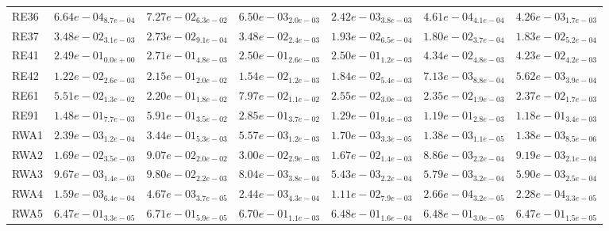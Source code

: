 \documentclass{article}
\begin{document}
\begin{table}
\begin{scriptsize}
\begin{tabular}{lllllll}
RE36 & \cellcolor{gray25}$  6.64e-04_{ 8.7e-04}$ & $  7.27e-02_{ 6.3e-02}$ & $  6.50e-03_{ 2.0e-03}$ & $  2.42e-03_{ 3.8e-03}$ & \cellcolor{gray95}$  4.61e-04_{ 4.1e-04}$ & $  4.26e-03_{ 1.7e-03}$ \\
RE37 & $  3.48e-02_{ 3.1e-03}$ & $  2.73e-02_{ 9.1e-04}$ & $  3.48e-02_{ 2.4e-03}$ & $  1.93e-02_{ 6.5e-04}$ & \cellcolor{gray95}$  1.80e-02_{ 3.7e-04}$ & \cellcolor{gray25}$  1.83e-02_{ 5.2e-04}$ \\
RE41 & $  2.49e-01_{ 0.0e+00}$ & $  2.71e-01_{ 4.8e-03}$ & $  2.50e-01_{ 2.6e-03}$ & $  2.50e-01_{ 1.2e-03}$ & \cellcolor{gray25}$  4.34e-02_{ 4.8e-03}$ & \cellcolor{gray95}$  4.23e-02_{ 4.2e-03}$ \\
RE42 & $  1.22e-02_{ 2.6e-03}$ & $  2.15e-01_{ 2.0e-02}$ & $  1.54e-02_{ 1.2e-03}$ & $  1.84e-02_{ 5.4e-03}$ & \cellcolor{gray25}$  7.13e-03_{ 8.8e-04}$ & \cellcolor{gray95}$  5.62e-03_{ 3.9e-04}$ \\
RE61 & $  5.51e-02_{ 1.3e-02}$ & $  2.20e-01_{ 1.8e-02}$ & $  7.97e-02_{ 1.1e-02}$ & $  2.55e-02_{ 3.0e-03}$ & \cellcolor{gray95}$  2.35e-02_{ 1.9e-03}$ & \cellcolor{gray25}$  2.37e-02_{ 1.7e-03}$ \\
RE91 & $  1.48e-01_{ 7.7e-03}$ & $  5.91e-01_{ 3.5e-02}$ & $  2.85e-01_{ 3.7e-02}$ & $  1.29e-01_{ 9.4e-03}$ & \cellcolor{gray25}$  1.19e-01_{ 2.8e-03}$ & \cellcolor{gray95}$  1.18e-01_{ 3.4e-03}$ \\
RWA1 & $  2.39e-03_{ 1.2e-04}$ & $  3.44e-01_{ 5.3e-03}$ & $  5.57e-03_{ 1.2e-03}$ & $  1.70e-03_{ 3.3e-05}$ & \cellcolor{gray25}$  1.38e-03_{ 1.1e-05}$ & \cellcolor{gray95}$  1.38e-03_{ 8.5e-06}$ \\
RWA2 & $  1.69e-02_{ 3.5e-03}$ & $  9.07e-02_{ 2.0e-02}$ & $  3.00e-02_{ 2.9e-03}$ & $  1.67e-02_{ 1.4e-03}$ & \cellcolor{gray95}$  8.86e-03_{ 2.2e-04}$ & \cellcolor{gray25}$  9.19e-03_{ 2.1e-04}$ \\
RWA3 & $  9.67e-03_{ 1.4e-03}$ & $  9.80e-02_{ 2.2e-03}$ & $  8.04e-03_{ 3.8e-04}$ & \cellcolor{gray95}$  5.43e-03_{ 2.2e-04}$ & \cellcolor{gray25}$  5.79e-03_{ 3.2e-04}$ & $  5.90e-03_{ 2.5e-04}$ \\
RWA4 & $  1.59e-03_{ 6.4e-04}$ & $  4.67e-03_{ 3.7e-05}$ & $  2.44e-03_{ 4.3e-04}$ & $  1.11e-02_{ 7.9e-03}$ & \cellcolor{gray25}$  2.66e-04_{ 3.2e-05}$ & \cellcolor{gray95}$  2.28e-04_{ 3.3e-05}$ \\
RWA5 & \cellcolor{gray25}$  6.47e-01_{ 3.3e-05}$ & $  6.71e-01_{ 5.9e-05}$ & $  6.70e-01_{ 1.1e-03}$ & $  6.48e-01_{ 1.6e-04}$ & $  6.48e-01_{ 3.0e-05}$ & \cellcolor{gray95}$  6.47e-01_{ 1.5e-05}$ \\

\end{tabular}
\end{scriptsize}
\end{table}
\end{document}
